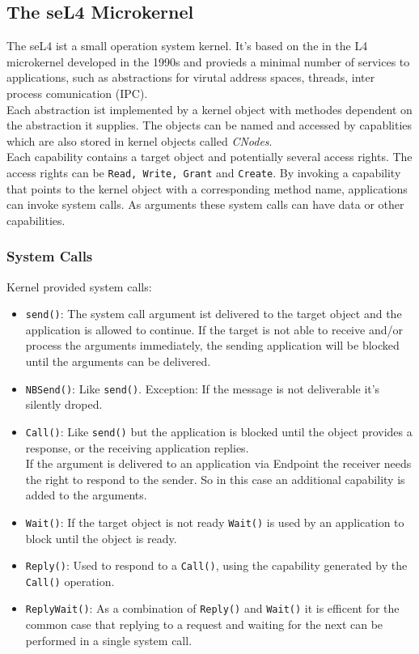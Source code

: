 \subsection{The seL4 Microkernel}\label{sec:seL4}
	The seL4 \cite{Manual} ist a small operation system kernel. It's based on the in the L4 microkernel developed in the 1990s and provieds a minimal number of services to applications, such as abstractions for virutal address spaces, threads, inter process comunication (IPC). \\
	Each abstraction ist implemented by a kernel object with methodes dependent on the abstraction it supplies. The objects can be named and accessed by capablities which are also stored in kernel objects called \textit{CNodes}. \\
	Each capability contains a target object and potentially several access rights. The access rights can be \texttt{Read, Write, Grant} and \texttt{Create}. By invoking a capability that points to the kernel object  with a corresponding method name, applications can invoke system calls. As arguments these system calls can have data or other capabilities. 

\subsubsection{System Calls}
Kernel provided system calls:
\begin{itemize}
\item \texttt{send()}: The system call argument ist delivered to the target object and the application is allowed to continue. If the target is not able to receive and/or process the arguments immediately, the sending application will be blocked until the arguments can be delivered.

\item \texttt{NBSend()}: Like \texttt{send()}. Exception: If the message is not deliverable it's silently droped.
\item \texttt{Call()}: Like \texttt{send()} but the application is blocked until the object provides a response, or the receiving application replies. \\
If the argument is delivered to an application via Endpoint the receiver needs the right to respond to the sender. So in this case an additional capability is added to the arguments. 
\item \texttt{Wait()}: If the target object is not ready \texttt{Wait()} is used by an application to block until the object is ready. 
\item \texttt{Reply()}: Used to respond to a \texttt{Call()}, using the capability generated by the \texttt{Call()} operation.
\item \texttt{ReplyWait()}: As a combination of \texttt{Reply()} and \texttt{Wait()} it is efficent for the common case that replying to a request and waiting for the next can be performed in a single system call. 
\end{itemize}
	
